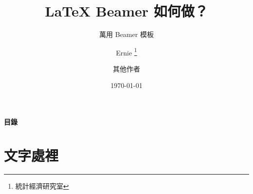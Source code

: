\documentclass[12pt, aspectratio=43]{beamer}
\begin{document}


\title[\LaTeX{}  Beamer 如何做？]{\Huge{\textbf{\LaTeX{} Beamer 如何做？}}} 

\subtitle{萬用 Beamer 模板} 

\author[Ernie]{%
Ernie  \thanks{統計經濟研究室} \and%
其他作者
}


\date[\today]{\today}


\begin{frame}
	\titlepage %
\end{frame}


\begin{frame}{\textbf{目錄}}
	\tableofcontents %
\end{frame}




\section{文字處裡}

\end{document}
